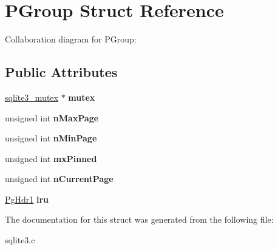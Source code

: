 \hypertarget{structPGroup}{}\section{P\+Group Struct Reference}
\label{structPGroup}


Collaboration diagram for P\+Group\+:
\subsection*{Public Attributes}
\begin{DoxyCompactItemize}
\item 
\hyperlink{structsqlite3__mutex}{sqlite3\+\_\+mutex} $\ast$ {\bfseries mutex}\hypertarget{structPGroup_a7173aa723aa61d6b1f79cde2f7d0f74d}{}\label{structPGroup_a7173aa723aa61d6b1f79cde2f7d0f74d}

\item 
unsigned int {\bfseries n\+Max\+Page}\hypertarget{structPGroup_a219ff89d38529cbb6b47e60f41896f41}{}\label{structPGroup_a219ff89d38529cbb6b47e60f41896f41}

\item 
unsigned int {\bfseries n\+Min\+Page}\hypertarget{structPGroup_aedf84324cb7138c9f9ee31814e8274c0}{}\label{structPGroup_aedf84324cb7138c9f9ee31814e8274c0}

\item 
unsigned int {\bfseries mx\+Pinned}\hypertarget{structPGroup_ac7cdffac1c20d260e8230dba4ab05cea}{}\label{structPGroup_ac7cdffac1c20d260e8230dba4ab05cea}

\item 
unsigned int {\bfseries n\+Current\+Page}\hypertarget{structPGroup_a532a09e3e6bf7a20a934764b4bd698a5}{}\label{structPGroup_a532a09e3e6bf7a20a934764b4bd698a5}

\item 
\hyperlink{structPgHdr1}{Pg\+Hdr1} {\bfseries lru}\hypertarget{structPGroup_a73c1201996cb4750677fdf1d73f50a92}{}\label{structPGroup_a73c1201996cb4750677fdf1d73f50a92}

\end{DoxyCompactItemize}


The documentation for this struct was generated from the following file\+:\begin{DoxyCompactItemize}
\item 
sqlite3.\+c\end{DoxyCompactItemize}

